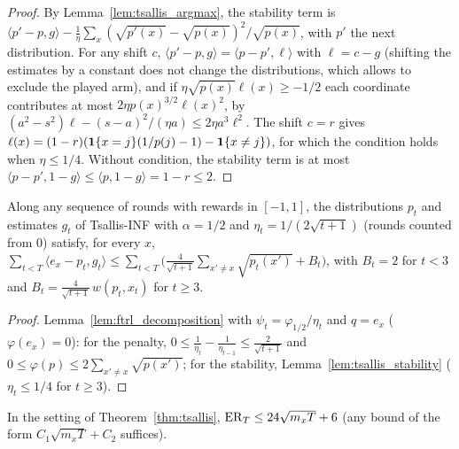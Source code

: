 \begin{proof}
  \leanok
  By Lemma~\ref{lem:tsallis_argmax}, the stability term is $\langle p' - p, g\rangle - \frac1\eta
  \sum_x (\sqrt{p'(x)} - \sqrt{p(x)})^2/\sqrt{p(x)}$, with $p'$ the next distribution. For any
  shift $c$, $\langle p' - p, g\rangle = \langle p - p', \ell\rangle$ with $\ell = c - g$ (shifting
  the estimates by a constant does not change the distributions, which allows to exclude the
  played arm), and if $\eta\sqrt{p(x)}\ell(x) \ge -1/2$ each coordinate contributes at most $2\eta
  p(x)^{3/2}\ell(x)^2$, by $(a^2 - s^2)\ell - (s - a)^2/(\eta a) \le 2\eta a^3\ell^2$. The shift $c
  = r$ gives $\ell(x) = (1 - r)(\mathbf{1}\{x = j\}(1/p(j) - 1) - \mathbf{1}\{x \ne j\})$, for which the
  condition holds when $\eta \le 1/4$. Without condition, the stability term is at most $\langle p
  - p', 1 - g\rangle \le \langle p, 1 - g\rangle = 1 - r \le 2$.
\end{proof}

\begin{lemma}
  \label{lem:tsallis_pathwise}
  \leanok
  Along any sequence of rounds with rewards in $[-1, 1]$, the distributions $p_t$ and estimates
  $g_t$ of Tsallis-INF with $\alpha = 1/2$ and $\eta_t = 1/(2\sqrt{t + 1})$ (rounds counted from
  $0$) satisfy, for every $x$,
  $\sum_{t < T}\langle e_x - p_t, g_t\rangle \le \sum_{t < T}\bigl(\frac{4}{\sqrt{t + 1}}\sum_{x'
  \ne x}\sqrt{p_t(x')} + B_t\bigr)$, with $B_t = 2$ for $t < 3$ and $B_t = \frac{4}{\sqrt{t +
  1}}\, w(p_t, x_t)$ for $t \ge 3$.
\end{lemma}

\begin{proof}
  \leanok
  Lemma~\ref{lem:ftrl_decomposition} with $\psi_t = \varphi_{1/2}/\eta_t$ and $q = e_x$
  ($\varphi(e_x) = 0$): for the penalty, $0 \le \frac{1}{\eta_t} - \frac{1}{\eta_{t-1}} \le
  \frac{2}{\sqrt{t + 1}}$ and $0 \le \varphi(p) \le 2\sum_{x' \ne x}\sqrt{p(x')}$; for the
  stability, Lemma~\ref{lem:tsallis_stability} ($\eta_t \le 1/4$ for $t \ge 3$).
\end{proof}

\begin{lemma}
  \label{lem:tsallis_inf_worst}
  \leanok
  In the setting of Theorem~\ref{thm:tsallis}, $\mathrm{ER}_T \le 24\sqrt{m_x T} + 6$ (any bound of the
  form $C_1\sqrt{m_x T} + C_2$ suffices).
\end{lemma}

